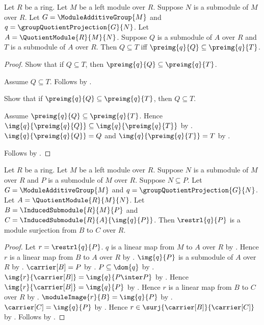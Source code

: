 \begin{theorem}\label{module_quotient_correspondence_preimage_inclusion}
    Let $R$ be a ring.
    Let $M$ be a left module over $R$.
    Suppose $N$ is a submodule of $M$ over $R$.
    Let $G=\ModuleAdditiveGroup{M}$ and
        $q=\groupQuotientProjection{G}{N}$.
    Let $A=\QuotientModule{R}{M}{N}$.
    Suppose $Q$ is a submodule of $A$ over $R$ and
        $T$ is a submodule of $A$ over $R$.
    Then $Q\subseteq T$ iff
        $\preimg{q}{Q}\subseteq\preimg{q}{T}$.
\end{theorem}
\begin{proof}
    Show that if $Q\subseteq T$, then
        $\preimg{q}{Q}\subseteq\preimg{q}{T}$.
    \begin{subproof}
        Assume $Q\subseteq T$.
        Follows by .
    \end{subproof}
    Show that if $\preimg{q}{Q}\subseteq\preimg{q}{T}$, then
        $Q\subseteq T$.
    \begin{subproof}
        Assume $\preimg{q}{Q}\subseteq\preimg{q}{T}$.
        Hence
            $\img{q}{\preimg{q}{Q}}
                \subseteq\img{q}{\preimg{q}{T}}$ by
            .
        $\img{q}{\preimg{q}{Q}}=Q$ and
            $\img{q}{\preimg{q}{T}}=T$ by
            .
    \end{subproof}
    Follows by \auto.
\end{proof}

\begin{theorem}\label{module_quotient_correspondence_image_transport}
    Let $R$ be a ring.
    Let $M$ be a left module over $R$.
    Suppose $N$ is a submodule of $M$ over $R$ and
        $P$ is a submodule of $M$ over $R$.
    Suppose $N\subseteq P$.
    Let $G=\ModuleAdditiveGroup{M}$ and
        $q=\groupQuotientProjection{G}{N}$.
    Let $A=\QuotientModule{R}{M}{N}$.
    Let $B=\InducedSubmodule{R}{M}{P}$ and
        $C=\InducedSubmodule{R}{A}{\img{q}{P}}$.
    Then $\restrl{q}{P}$ is a module surjection from $B$ to $C$ over $R$.
\end{theorem}
\begin{proof}
    Let $r=\restrl{q}{P}$.
    $q$ is a linear map from $M$ to $A$ over $R$ by
        .
    Hence $r$ is a linear map from $B$ to $A$ over $R$ by
        .
    $\img{q}{P}$ is a submodule of $A$ over $R$ by
        .
    $\carrier[B]=P$ by .
    $P\subseteq\dom{q}$ by
        .
    $\img{r}{\carrier[B]}=\img{q}{P\inter P}$ by
        .
    Hence $\img{r}{\carrier[B]}=\img{q}{P}$ by
        .
    Hence $r$ is a linear map from $B$ to $C$ over $R$ by
        .
    $\moduleImage{r}{B}=\img{q}{P}$ by
        .
    $\carrier[C]=\img{q}{P}$ by
        .
    Hence $r\in\surj{\carrier[B]}{\carrier[C]}$ by
        .
    Follows by .
\end{proof}

